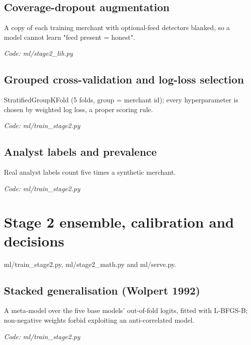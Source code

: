 \documentclass[11pt,a4paper]{article}
\newcommand{\where}[1]{\par{\small\itshape\color{mute}Code: #1}\par}
\begin{document}
\subsection*{Coverage-dropout augmentation}
\par\smallskip\noindent{}\par\smallskip
A copy of each training merchant with optional-feed detectors blanked, so a model cannot learn "feed present = honest".
\where{ml/stage2\_lib.py}

\subsection*{Grouped cross-validation and log-loss selection}
\par\smallskip\noindent{}\par\smallskip
StratifiedGroupKFold (5 folds, group = merchant id); every hyperparameter is chosen by weighted log loss, a proper scoring rule.
\where{ml/train\_stage2.py}

\subsection*{Analyst labels and prevalence}
\par\smallskip\noindent{}\par\smallskip
Real analyst labels count five times a synthetic merchant.
\where{ml/train\_stage2.py}

\clearpage
\section{Stage 2 ensemble, calibration and decisions}
{\color{mute}ml/train\_stage2.py, ml/stage2\_math.py and ml/serve.py.}

\subsection*{Stacked generalisation (Wolpert 1992)}
\par\smallskip\noindent{}\par\smallskip
\par\smallskip\noindent{}\par\smallskip
A meta-model over the five base models' out-of-fold logits, fitted with L-BFGS-B; non-negative weights forbid exploiting an anti-correlated model.
\where{ml/train\_stage2.py}
\end{document}
